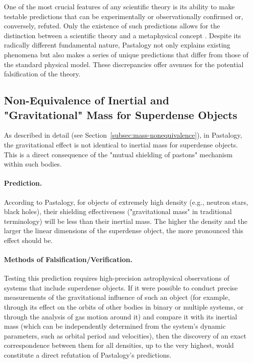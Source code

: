 \documentclass[pdflatex,sn-mathphys-num]{sn-jnl}
\begin{document}
One of the most crucial features of any scientific theory is its ability to make testable predictions that can be experimentally or observationally confirmed or, conversely, refuted. Only the existence of such predictions allows for the distinction between a scientific theory and a metaphysical concept \cite{popper1959}. Despite its radically different fundamental nature, Pastalogy not only explains existing phenomena but also makes a series of unique predictions that differ from those of the standard physical model. These discrepancies offer avenues for the potential falsification of the theory.

\subsection{Non-Equivalence of Inertial and "Gravitational" Mass for Superdense Objects}\label{subsec:mass-inequivalence}

As described in detail (see Section~\ref{subsec:mass-nonequivalence}), in Pastalogy, the gravitational effect is not identical to inertial mass for superdense objects. This is a direct consequence of the "mutual shielding of pastons" mechanism within such bodies.

\paragraph{Prediction.} According to Pastalogy, for objects of extremely high density (e.g., neutron stars, black holes), their shielding effectiveness ("gravitational mass" in traditional terminology) will be less than their inertial mass. The higher the density and the larger the linear dimensions of the superdense object, the more pronounced this effect should be.

\paragraph{Methods of Falsification/Verification.} Testing this prediction requires high-precision astrophysical observations of systems that include superdense objects. If it were possible to conduct precise measurements of the gravitational influence of such an object (for example, through its effect on the orbits of other bodies in binary or multiple systems, or through the analysis of gas motion around it) and compare it with its inertial mass (which can be independently determined from the system's dynamic parameters, such as orbital period and velocities), then the discovery of an exact correspondence between them for all densities, up to the very highest, would constitute a direct refutation of Pastalogy's predictions.
\end{document}
